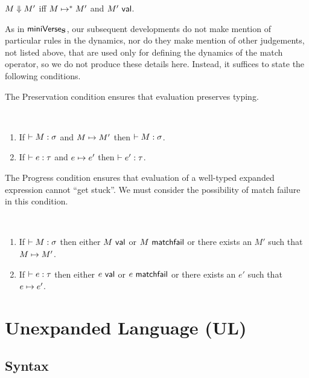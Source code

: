 \begin{definition}\label{defn:evaluation-modules-P} $M \Downarrow M'$ iff $M \mapsto^{*} M'$ and $M'~\mathsf{val}$. \end{definition}



As in $\mathsf{miniVerse}_\textbf{S}$, our subsequent developments do not make mention of particular rules in the dynamics, nor do they make mention of other judgements, not listed above, that are used only for defining the dynamics of the match operator, so we do not produce these details here. Instead, it suffices to state the following conditions.

The Preservation condition ensures that evaluation preserves typing.
\begin{condition}[Preservation]\label{condition:preservation-P} ~
\begin{enumerate}
\item If $\vdash M : \sigma$ and $M \mapsto M'$ then $\vdash M : \sigma$.
\item If $\vdash e : \tau$ and $e \mapsto e'$ then $\vdash e' : \tau$.
\end{enumerate}
\end{condition}

The Progress condition ensures that evaluation of a well-typed expanded expression cannot ``get stuck''. We must consider the possibility of match failure in this condition.
\begin{condition}[Progress]\label{condition:progress-P} ~
\begin{enumerate}
\item If $\vdash M : \sigma$ then either $M~\mathsf{val}$ or $M~\mathsf{matchfail}$ or there exists an $M'$ such that $M \mapsto M'$.
\item If $\vdash e : \tau$ then either $e~\mathsf{val}$ or $e~\mathsf{matchfail}$ or there exists an $e'$ such that $e \mapsto e'$.
\end{enumerate}
\end{condition}

\section{Unexpanded Language (UL)}
\subsection{Syntax}
